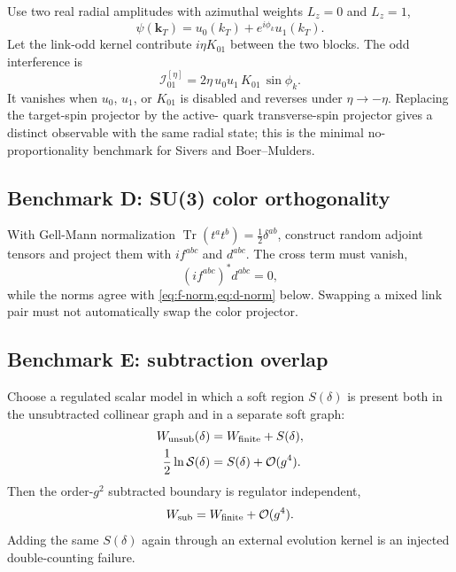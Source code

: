 \documentclass[11pt]{article}
\newcommand{\kT}{\bm{k}_{T}}
\newcommand{\Tr}{\operatorname{Tr}}
\newcommand{\cO}{\mathcal O}
\newcommand{\cS}{\mathcal S}
\newcommand{\cI}{\mathcal I}
\newcommand{\unsub}{\mathrm{unsub}}
\newcommand{\subtr}{\mathrm{sub}}
\begin{document}
Use two real radial amplitudes with azimuthal weights \(L_z=0\) and \(L_z=1\),
\begin{equation}
 \psi(\kT)=u_0(k_T)+e^{i\phi_k}u_1(k_T).
\label{eq:minimal-oam-state}
\end{equation}
Let the link-odd kernel contribute \(i\eta K_{01}\) between the two blocks.
The odd interference is
\begin{equation}
 \cI_{01}^{[\eta]}
 =2\eta\,u_0u_1\,K_{01}\,\sin\phi_k.
\label{eq:minimal-oam-interference}
\end{equation}
It vanishes when \(u_0\), \(u_1\), or \(K_{01}\) is disabled and reverses
under \(\eta\to-\eta\).  Replacing the target-spin projector by the active-
quark transverse-spin projector gives a distinct observable with the same
radial state; this is the minimal no-proportionality benchmark for Sivers and
Boer--Mulders.

\subsection{Benchmark D: SU(3) color orthogonality}

With Gell-Mann normalization
\(\Tr(t^at^b)=\tfrac12\delta^{ab}\), construct random adjoint tensors and
project them with \(if^{abc}\) and \(d^{abc}\).  The cross term must vanish,
\begin{equation}
 (if^{abc})^*d^{abc}=0,
\label{eq:fd-orthogonality-benchmark}
\end{equation}
while the norms agree with \cref{eq:f-norm,eq:d-norm} below.  Swapping a mixed
link pair must not automatically swap the color projector.

\subsection{Benchmark E: subtraction overlap}

Choose a regulated scalar model in which a soft region \(S(\delta)\) is
present both in the unsubtracted collinear graph and in a separate soft graph:
\begin{align}
 W_{\unsub}(\delta)&=W_{\rm finite}+S(\delta),
\notag\\
 \frac12\ln \cS(\delta)&=S(\delta)+\cO(g^4).
\label{eq:scalar-soft-benchmark}
\end{align}
Then the order-\(g^2\) subtracted boundary is regulator independent,
\begin{equation}
 W_{\subtr}=W_{\rm finite}+\cO(g^4).
\label{eq:scalar-soft-cancellation}
\end{equation}
Adding the same \(S(\delta)\) again through an external evolution kernel is an
injected double-counting failure.
\end{document}
